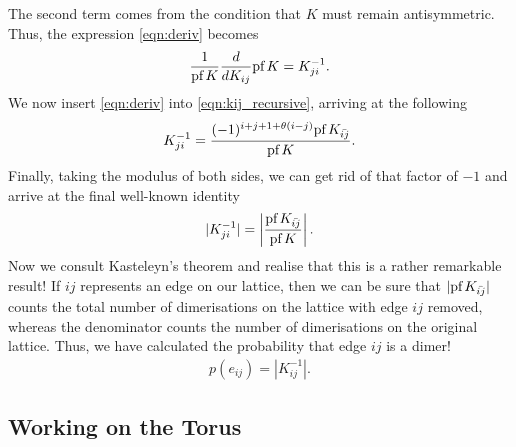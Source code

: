 \documentclass[11pt, oneside]{article} %
\numberwithin{equation}{section}
\begin{document}
The second term comes from the condition that $K$ must remain antisymmetric. Thus, the expression \ref{eqn:deriv} becomes
\begin{align} \label{eqn:kij_inv}
    \frac{1}{\textup{pf}\, K} \frac d {dK_{ij}} \textup{pf}\, K = K^{-1}_{ji}.
\end{align}
We now insert \cref{eqn:deriv} into \cref{eqn:kij_recursive}, arriving at the following
\begin{align}\label{eqn:kij_in_k}
    K^{-1}_{ji} = \frac{
        (-1)^{i+j+1+\theta(i-j)} 
        \textup{pf}\,{K_{\bar {ij}}}
    } {
        \textup{pf}\, K
    }.
\end{align}
Finally, taking the modulus of both sides, we can get rid of that factor of $-1$ and arrive at the final well-known identity 
\begin{align}
    |K^{-1}_{ji}| = \left | \frac{
        \textup{pf}\,{K_{\bar {ij}}}
    } {
        \textup{pf}\, K
    }\right |.
\end{align}
Now we consult Kasteleyn's theorem and realise that this is a rather remarkable result! If $ij$ represents an edge on our lattice, then we can be sure that $|\textup{pf}\,{K_{\bar {ij}}}|$ counts the total number of dimerisations on the lattice with edge $ij$ removed, whereas the denominator counts the number of dimerisations on the original lattice. Thus, we have calculated the probability that edge $ij$ is a dimer!
\begin{align}
    p(e_{ij}) = |K_{ij}^{-1}|.
\end{align}

\subsection{Working on the Torus}
\end{document}
